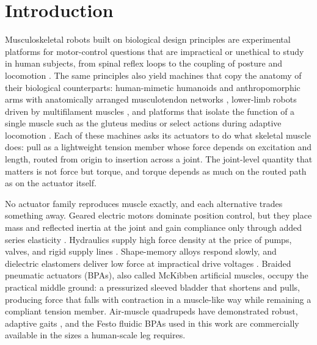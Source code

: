 \documentclass[utf8]{FrontiersinHarvard} %
\begin{document}
\section{Introduction}

Musculoskeletal robots built on biological design principles are experimental platforms for motor-control questions that are impractical or unethical to study in human subjects, from spinal reflex loops to the coupling of posture and locomotion \citep{ijspeert_amphibious_2020, goldsmith_investigating_2021, liu_robotic_2018}. The same principles also yield machines that copy the anatomy of their biological counterparts: human-mimetic humanoids and anthropomorphic arms with anatomically arranged musculotendon networks \citep{asano_design_2017, asano_musculoskeletal_2019, hitzmann_anthropomorphic_2018}, lower-limb robots driven by multifilament muscles \citep{kurumaya_musculoskeletal_2016}, and platforms that isolate the function of a single muscle such as the gluteus medius \citep{shin_constructive_2018} or select actions during adaptive locomotion \citep{schilling_adaptive_2022}. Each of these machines asks its actuators to do what skeletal muscle does: pull as a lightweight tension member whose force depends on excitation and length, routed from origin to insertion across a joint. The joint-level quantity that matters is not force but torque, and torque depends as much on the routed path as on the actuator itself.

No actuator family reproduces muscle exactly, and each alternative trades something away. Geared electric motors dominate position control, but they place mass and reflected inertia at the joint and gain compliance only through added series elasticity \citep{veale_towards_2016}. Hydraulics supply high force density at the price of pumps, valves, and rigid supply lines \citep{suzumori_trends_2018}. Shape-memory alloys respond slowly, and dielectric elastomers deliver low force at impractical drive voltages \citep{madden_artificial_2004}. Braided pneumatic actuators (BPAs), also called McKibben artificial muscles, occupy the practical middle ground: a pressurized sleeved bladder that shortens and pulls, producing force that falls with contraction in a muscle-like way while remaining a compliant tension member. Air-muscle quadrupeds have demonstrated robust, adaptive gaits \citep{aschenbeck_design_2006}, and the Festo fluidic BPAs used in this work are commercially available in the sizes a human-scale leg requires.
\end{document}
